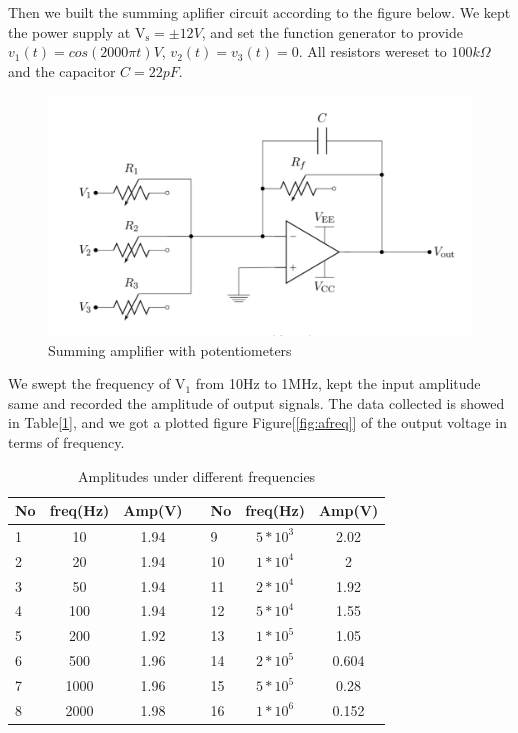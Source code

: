 \hfill \newline
\phantom{ } Then we built the summing aplifier circuit according to the figure below. We kept the power supply at $ \mathrm{V_s} = \pm12\si{V} $, and set the function generator to provide ${v_1}(t)=cos(2000\pi t)\si{V}$, ${v_2}(t)={v_3}(t)=0$. All resistors wereset to $100\si{k\Omega}$ and the capacitor $C=22\si{pF}$.
\begin{figure}[!htbp]
	\centering 
	\begin{framed}
		\includegraphics[width=\linewidth]{images/summing_amp.PNG} 
		\caption{Summing amplifier with potentiometers}
		\label{fig:samp} 
	\end{framed}
\end{figure} 

\phantom{ } We swept the frequency of $\mathrm{V_1}$ from 10Hz to 1MHz, kept the input amplitude same and recorded the amplitude of output signals. The data collected is showed in Table[\ref{tab:caf}], and we got a plotted figure Figure[\ref{fig:afreq}] of the output voltage in terms of frequency.

\begin{table}[!htbp]
	\centering
	\caption{Amplitudes under different frequencies}
	\begin{tabular}{lccllcc}
		\toprule
		No&freq(Hz)&Amp(V)&&No&freq(Hz)  &Amp(V)\\
		\midrule
		1	&10		&1.94	&&9 &$5*10^3$&2.02\\
		2	&20		&1.94	&&10&$1*10^4$&2\\
		3	&50		&1.94	&&11&$2*10^4$&1.92\\
		4	&100	&1.94	&&12&$5*10^4$&1.55\\
		5	&200	&1.92	&&13&$1*10^5$&1.05\\
		6	&500	&1.96	&&14&$2*10^5$&0.604\\
		7	&1000	&1.96	&&15&$5*10^5$&0.28\\
		8	&2000	&1.98	&&16&$1*10^6$&0.152\\
		\bottomrule
	\end{tabular}
	\label{tab:caf}
\end{table}

